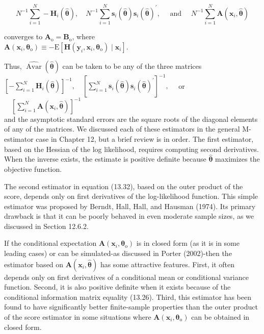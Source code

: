\documentclass[10pt]{article}
\begin{document}
\begin{equation*}
N^{-1} \sum_{i=1}^{N}-\mathbf{H}_{i}(\hat{\boldsymbol{\theta}}), \quad N^{-1} \sum_{i=1}^{N} \mathbf{s}_{i}(\hat{\boldsymbol{\theta}}) \mathbf{s}_{i}(\hat{\boldsymbol{\theta}})^{\prime}, \quad \text { and } \quad N^{-1} \sum_{i=1}^{N} \mathbf{A}\left(\mathbf{x}_{i}, \hat{\boldsymbol{\theta}}\right) \tag{13.30}
\end{equation*}


converges to $\mathbf{A}_{\mathrm{o}}=\mathbf{B}_{\mathrm{o}}$, where\\
$\mathbf{A}\left(\mathbf{x}_{i}, \boldsymbol{\theta}_{\mathrm{o}}\right) \equiv-\mathrm{E}\left[\mathbf{H}\left(\mathbf{y}_{i}, \mathbf{x}_{i}, \boldsymbol{\theta}_{\mathrm{o}}\right) \mid \mathbf{x}_{i}\right]$.

Thus, $\widehat{\operatorname{Avar}}(\hat{\boldsymbol{\theta}})$ can be taken to be any of the three matrices\\
$\left[-\sum_{i=1}^{N} \mathbf{H}_{i}(\hat{\boldsymbol{\theta}})\right]^{-1}, \quad\left[\sum_{i=1}^{N} \mathbf{s}_{i}(\hat{\boldsymbol{\theta}}) \mathbf{s}_{i}(\hat{\boldsymbol{\theta}})^{\prime}\right]^{-1}, \quad$ or $\quad\left[\sum_{i=1}^{N} \mathbf{A}\left(\mathbf{x}_{i}, \hat{\boldsymbol{\theta}}\right)\right]^{-1}$\\
and the asymptotic standard errors are the square roots of the diagonal elements of any of the matrices. We discussed each of these estimators in the general M-estimator case in Chapter 12, but a brief review is in order. The first estimator, based on the Hessian of the log likelihood, requires computing second derivatives. When the inverse exists, the estimate is positive definite because $\hat{\boldsymbol{\theta}}$ maximizes the objective function.

The second estimator in equation (13.32), based on the outer product of the score, depends only on first derivatives of the log-likelihood function. This simple estimator was proposed by Berndt, Hall, Hall, and Hausman (1974). Its primary drawback is that it can be poorly behaved in even moderate sample sizes, as we discussed in Section 12.6.2.

If the conditional expectation $\mathbf{A}\left(\mathbf{x}_{i}, \boldsymbol{\theta}_{\mathrm{o}}\right)$ is in closed form (as it is in some leading cases) or can be simulated-as discussed in Porter (2002)-then the estimator based on $\mathbf{A}\left(\mathbf{x}_{i}, \hat{\boldsymbol{\theta}}\right)$ has some attractive features. First, it often depends only on first derivatives of a conditional mean or conditional variance function. Second, it is also positive definite when it exists because of the conditional information matrix equality (13.26). Third, this estimator has been found to have significantly better finite-sample properties than the outer product of the score estimator in some situations where $\mathbf{A}\left(\mathbf{x}_{i}, \boldsymbol{\theta}_{\mathrm{o}}\right)$ can be obtained in closed form.
\end{document}
